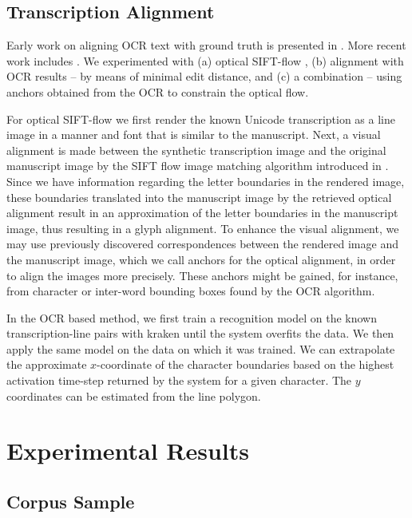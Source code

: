\subsection{Transcription Alignment}

Early work on aligning OCR text with ground truth is presented in \cite{Hobby}.
More recent work includes
\cite{DBLP:conf/jcdl/FengM06,DBLP:conf/icdar/YalnizM11,fischer2011transcription,OFTA,Leydier2014alignment,dense,Leydier2016alignment,Boillet2019}.
We experimented with (a) optical SIFT-flow \cite{OFTA}, (b) alignment with OCR
results -- by means of minimal edit distance, and (c) a combination -- using
anchors obtained from the OCR to constrain the optical flow.

For optical SIFT-flow we first render the known Unicode transcription as a line
image in a manner and font that is similar to the manuscript.  Next, a visual
alignment is made between the synthetic transcription image and the original
manuscript image by the SIFT flow image matching algorithm introduced in
\cite{liu2011sift}.  Since we have information regarding the letter boundaries
in the rendered image, these boundaries translated into the manuscript image by
the retrieved optical alignment result in an approximation of the letter
boundaries in the manuscript image, thus resulting in a glyph alignment.  To
enhance the visual alignment, we may use previously discovered correspondences
between the rendered image and the manuscript image, which we call anchors for
the optical alignment, in order to align the images more precisely.  These
anchors might be gained, for instance, from character or inter-word bounding
boxes found by the OCR algorithm. 

In the OCR based method, we first train a recognition model on the known
transcription-line pairs with kraken until the system overfits the data.  We
then apply the same model on the data on which it was trained.  We can
extrapolate the approximate $x$-coordinate of the character boundaries based on
the highest activation time-step returned by the system for a given character.
The $y$ coordinates can be estimated from the line polygon.

\section{Experimental Results}

\subsection{Corpus Sample}\label{sec:seg}

